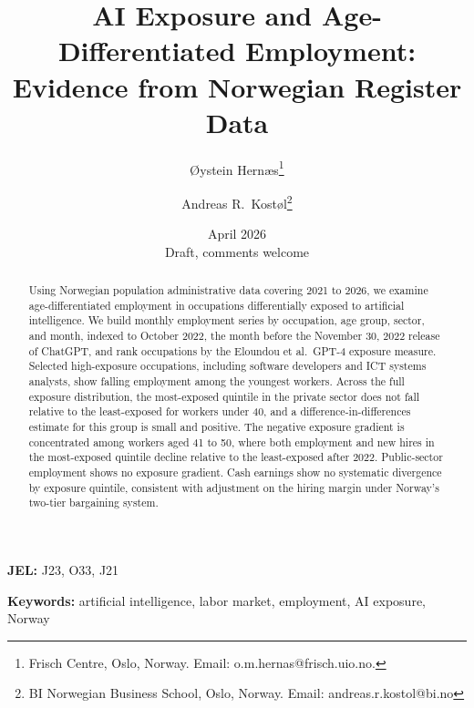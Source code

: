 \documentclass[12pt]{article}
\title{\textbf{AI Exposure and Age-Differentiated Employment:\\Evidence from Norwegian Register Data}}
\author{
  {\O}ystein Hern{\ae}s\thanks{Frisch Centre, Oslo, Norway. Email: o.m.hernas@frisch.uio.no.}
  \and
  Andreas R.\ Kost{\o}l\thanks{BI Norwegian Business School, Oslo, Norway. Email: andreas.r.kostol@bi.no}
}
\date{April 2026\\[6pt]\small Draft, comments welcome}
\begin{document}
\maketitle

\begin{abstract}
\noindent
Using Norwegian population administrative data covering 2021 to 2026, we examine age-differentiated employment in occupations differentially exposed to artificial intelligence. We build monthly employment series by occupation, age group, sector, and month, indexed to October 2022, the month before the November 30, 2022 release of ChatGPT, and rank occupations by the Eloundou et al.\ GPT-4 exposure measure. Selected high-exposure occupations, including software developers and ICT systems analysts, show falling employment among the youngest workers. Across the full exposure distribution, the most-exposed quintile in the private sector does not fall relative to the least-exposed for workers under 40, and a difference-in-differences estimate for this group is small and positive. The negative exposure gradient is concentrated among workers aged 41 to 50, where both employment and new hires in the most-exposed quintile decline relative to the least-exposed after 2022. Public-sector employment shows no exposure gradient. Cash earnings show no systematic divergence by exposure quintile, consistent with adjustment on the hiring margin under Norway's two-tier bargaining system.
\end{abstract}

\textbf{JEL:} J23, O33, J21

\textbf{Keywords:} artificial intelligence, labor market, employment, AI exposure, Norway

\clearpage
\setcounter{page}{1}

















\clearpage




\end{document}
